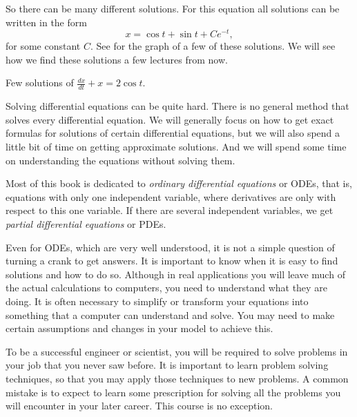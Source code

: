 So there can be many different solutions.  For this equation all
solutions can be written in the form
\begin{equation*}
x = \cos t + \sin t + C e^{-t} ,
\end{equation*}
for some constant $C$.  See  for the graph of a
few of these solutions. 
We will see how we find these solutions
a few lectures from now.

\medskip

\begin{mywrapfig}{3.25in}
\capstart
{}
\caption{Few solutions of $\frac{dx}{dt} + x = 2 \cos t$.\label{intro:plotsfig}}
\end{mywrapfig}%


Solving differential equations can be quite hard.  
There is no general method that solves every differential equation.  We will
generally focus on how to get exact formulas for solutions of certain
differential
equations, but we will also spend a little bit of time
on getting approximate solutions.
And we will spend some time on understanding the equations without solving
them.

Most of this book is dedicated to
\emph{ordinary differential equations}
or ODEs, that is, equations with
only one independent variable, where derivatives are only with respect to
this one variable.
If there are several independent variables, we get
\emph{partial differential equations}
or PDEs.

Even for ODEs, which are very well understood, it is not a simple question
of turning a crank to get answers.  
It is important to
know when it is easy to find solutions and how to do so.
Although in real applications you will
leave much of the actual calculations to computers, you
need to understand what they are doing.  It is often necessary
to simplify or transform your equations into something that a computer can
understand and solve.
You may need to make certain assumptions and changes in your
model to achieve this.

To be a successful engineer or scientist, you will be required to solve
problems in your job that you never saw before.  It is important to
learn problem solving techniques, so that you may apply those techniques to
new problems.  A common mistake is to expect to learn some prescription for
solving all the problems you will encounter in your later career.  This
course is no exception.


